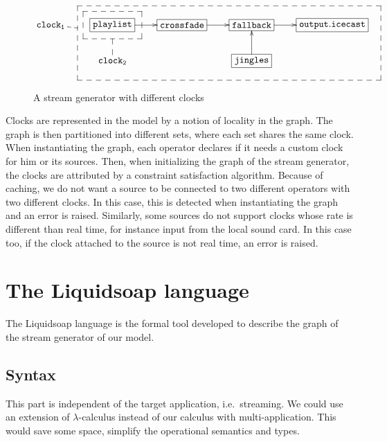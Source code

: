 \documentclass{llncs}
\newcommand{\liquidsoap}{Liquidsoap}
\newcommand{\ie}{{i.e.}}
\begin{document}
\begin{figure}[htn]
 \begin{center}
\[
\def\f{\save
*+<15pt>[F--]\frm{}\ar @{--} "2,2"\restore}%
\def\g{\save
"2,4"."1,2"."1,5"!C*+<27pt>[F--]\frm{}\ar @{--} "1,1"\restore}%
\xymatrix{
   \mathtt{clock_1} & *+[F]{\mathtt{playlist}}\ar[r]\f&*+[F]{\mathtt{crossfade}}\ar[r]&  *+[F]{\mathtt{fallback}}\ar[r]&
  *+[F]{\mathtt{output.icecast}}\\
   &\mathtt{clock_2} &  & *+[F]{\mathtt{jingles}}\ar[u]\g& 
}
\]
\end{center}
 \caption{A stream generator with different clocks}
\end{figure}

Clocks are represented in the model by a notion of locality in the graph. The graph is then partitioned into 
different sets, where each set shares the same clock.
When instantiating the graph, each operator declares if it needs a custom clock for him or its sources. 
Then, when initializing the graph of the stream generator, the clocks are attributed by a constraint 
satisfaction algorithm. Because of caching, we do not want a source to be connected to two different operators with 
two different clocks. In this case, this is detected when instantiating the graph and an error is raised.
Similarly, some sources do not support clocks whose rate is different than real time, for instance input 
from the local sound card. In this case too, if the clock attached to the source is not real time, an error
is raised.



\section{The \liquidsoap{} language}
\label{sec:lang}

The \liquidsoap{} language is the formal tool developed to describe the graph of the
stream generator of our model.

\subsection{Syntax}

This part is independent of the target application, \ie\ streaming.
We could use an extension of $\lambda$-calculus instead of our calculus with
multi-application. This would save some space, simplify the operational 
semantics and types.
\end{document}
